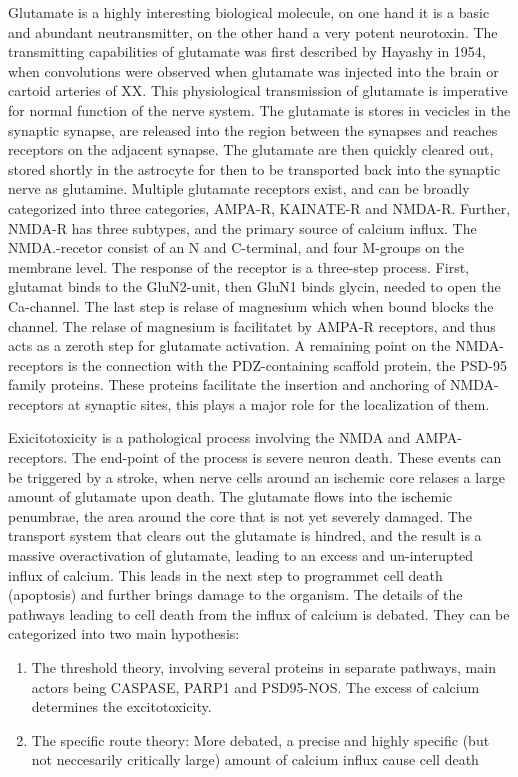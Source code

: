 \documentclass[12p]{article}
\begin{document}
Glutamate is a highly interesting biological molecule, on one hand it is a basic and abundant neutransmitter, on the other hand a very potent neurotoxin.
The transmitting capabilities of glutamate was first described by Hayashy in 1954, when convolutions were observed when glutamate was injected into the brain or cartoid arteries of XX.
This physiological transmission of glutamate is imperative for normal function of the nerve system.
The glutamate is stores in vecicles in the synaptic synapse, are released into the region between the synapses and reaches receptors on the adjacent synapse.
The glutamate are then quickly cleared out, stored shortly in the astrocyte for then to be transported back into the synaptic nerve as glutamine.
Multiple glutamate receptors exist, and can be broadly categorized into three categories, AMPA-R, KAINATE-R and NMDA-R.
Further, NMDA-R has three subtypes, and the primary source of calcium influx.
The NMDA.-recetor consist of an N and C-terminal, and four M-groups on the membrane level.
The response of the receptor is a three-step process.
First, glutamat binds to the GluN2-unit, then GluN1 binds glycin, needed to open the Ca-channel.
The last step is relase of magnesium which when bound blocks the channel.
The relase of magnesium is facilitatet by AMPA-R receptors, and thus acts as a zeroth step for glutamate activation.
A remaining point on the NMDA-receptors is the connection with the PDZ-containing scaffold protein, the PSD-95 family proteins.
These proteins facilitate the insertion and anchoring of NMDA-receptors at synaptic sites, this plays a major role for the localization of them.

Exicitotoxicity is a pathological process involving the NMDA and AMPA-receptors.
The end-point of the process is severe neuron death.
These events can be triggered by a stroke, when nerve cells around an ischemic core relases a large amount of glutamate upon death.
The glutamate flows into the ischemic penumbrae, the area around the core that is not yet severely damaged.
The transport system that clears out the glutamate is hindred, and the result is a massive overactivation of glutamate, leading to an excess and un-interupted influx of calcium.
This leads in the next step to programmet cell death (apoptosis) and further brings damage to the organism.
The details of the pathways leading to cell death from the influx of calcium is debated.
They can be categorized into two main hypothesis:

\begin{enumerate}
\item
The threshold theory, involving several proteins in separate pathways, main actors being CASPASE, PARP1 and PSD95-NOS. The excess of calcium determines the excitotoxicity.
\item
The specific route theory: More debated, a precise and highly specific (but not neccesarily critically large) amount of calcium influx cause cell death
\end{enumerate}
\end{document}
